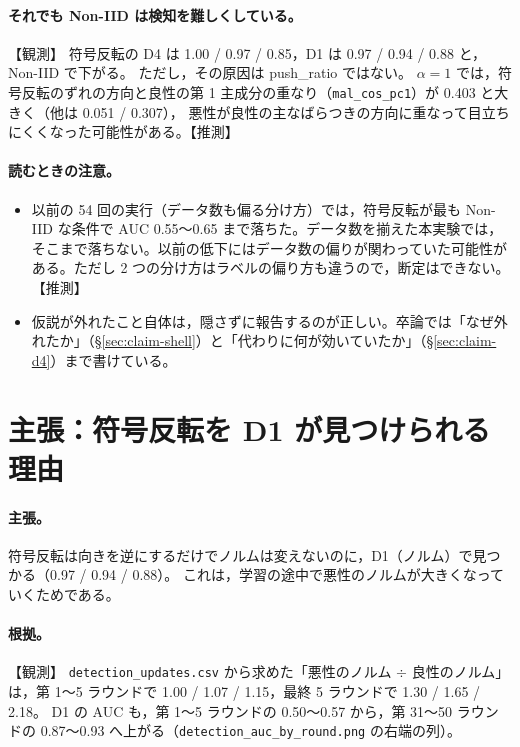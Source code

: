 \documentclass[a4j, dvipdfmx]{jsarticle}  %
\begin{document}
\paragraph{それでも Non-IID は検知を難しくしている。}【観測】
符号反転の D4 は 1.00 / 0.97 / 0.85，D1 は 0.97 / 0.94 / 0.88 と，Non-IID で下がる。
ただし，その原因は push\_ratio ではない。
$\alpha = 1$ では，符号反転のずれの方向と良性の第 1 主成分の重なり（\texttt{mal\_cos\_pc1}）が 0.403 と大きく（他は 0.051 / 0.307），
悪性が良性の主なばらつきの方向に重なって目立ちにくくなった可能性がある。【推測】

\paragraph{読むときの注意。}
\begin{itemize}
  \item 以前の 54 回の実行（データ数も偏る分け方）では，符号反転が最も Non-IID な条件で AUC 0.55〜0.65 まで落ちた。データ数を揃えた本実験では，そこまで落ちない。以前の低下にはデータ数の偏りが関わっていた可能性がある。ただし 2 つの分け方はラベルの偏り方も違うので，断定はできない。【推測】
  \item 仮説が外れたこと自体は，隠さずに報告するのが正しい。卒論では「なぜ外れたか」（\S\ref{sec:claim-shell}）と「代わりに何が効いていたか」（\S\ref{sec:claim-d4}）まで書けている。
\end{itemize}

\section{主張：符号反転を D1 が見つけられる理由}
\label{sec:claim-d1sf}

\paragraph{主張。}
符号反転は向きを逆にするだけでノルムは変えないのに，D1（ノルム）で見つかる（0.97 / 0.94 / 0.88）。
これは，学習の途中で悪性のノルムが大きくなっていくためである。

\paragraph{根拠。}【観測】
\texttt{detection\_updates.csv} から求めた「悪性のノルム $\div$ 良性のノルム」は，第 1〜5 ラウンドで 1.00 / 1.07 / 1.15，最終 5 ラウンドで 1.30 / 1.65 / 2.18。
D1 の AUC も，第 1〜5 ラウンドの 0.50〜0.57 から，第 31〜50 ラウンドの 0.87〜0.93 へ上がる（\texttt{detection\_auc\_by\_round.png} の右端の列）。
\end{document}
